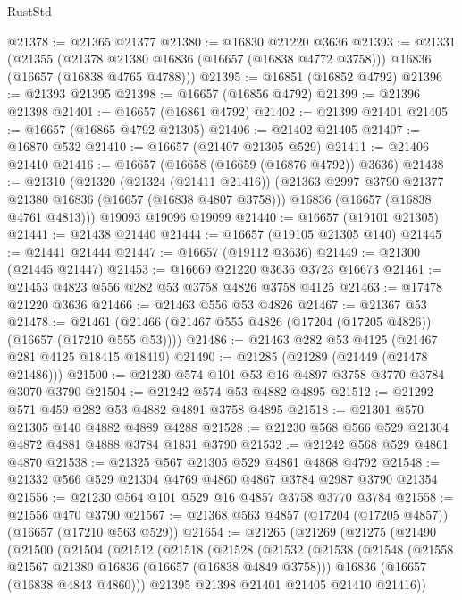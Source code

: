 \begin{lexlean}{RustStd}
\begin{coremodule}
@21378 := @21365 @21377
@21380 := @16830 @21220 @3636
@21393 := @21331
    (@21355
      (@21378 @21380 @16836 (@16657 (@16838 @4772 @3758)))
      @16836
      (@16657 (@16838 @4765 @4788)))
@21395 := @16851 (@16852 @4792)
@21396 := @21393 @21395
@21398 := @16657 (@16856 @4792)
@21399 := @21396 @21398
@21401 := @16657 (@16861 @4792)
@21402 := @21399 @21401
@21405 := @16657 (@16865 @4792 @21305)
@21406 := @21402 @21405
@21407 := @16870 @532
@21410 := @16657 (@21407 @21305 @529)
@21411 := @21406 @21410
@21416 := @16657 (@16658 (@16659 (@16876 @4792)) @3636)
@21438 := @21310
    (@21320
      (@21324 (@21411 @21416))
      (@21363 @2997 @3790 @21377 @21380 @16836 (@16657 (@16838 @4807 @3758)))
      @16836
      (@16657 (@16838 @4761 @4813)))
    @19093
    @19096
    @19099
@21440 := @16657 (@19101 @21305)
@21441 := @21438 @21440
@21444 := @16657 (@19105 @21305 @140)
@21445 := @21441 @21444
@21447 := @16657 (@19112 @3636)
@21449 := @21300 (@21445 @21447)
@21453 := @16669 @21220 @3636 @3723 @16673
@21461 := @21453 @4823 @556 @282 @53 @3758 @4826 @3758 @4125
@21463 := @17478 @21220 @3636
@21466 := @21463 @556 @53 @4826
@21467 := @21367 @53
@21478 := @21461 (@21466 (@21467 @555 @4826 (@17204 (@17205 @4826)) (@16657 (@17210 @555 @53))))
@21486 := @21463 @282 @53 @4125 (@21467 @281 @4125 @18415 @18419)
@21490 := @21285 (@21289 (@21449 (@21478 @21486)))
@21500 := @21230 @574 @101 @53 @16 @4897 @3758 @3770 @3784 @3070 @3790
@21504 := @21242 @574 @53 @4882 @4895
@21512 := @21292 @571 @459 @282 @53 @4882 @4891 @3758 @4895
@21518 := @21301 @570 @21305 @140 @4882 @4889 @4288
@21528 := @21230 @568 @566 @529 @21304 @4872 @4881 @4888 @3784 @1831 @3790
@21532 := @21242 @568 @529 @4861 @4870
@21538 := @21325 @567 @21305 @529 @4861 @4868 @4792
@21548 := @21332 @566 @529 @21304 @4769 @4860 @4867 @3784 @2987 @3790 @21354
@21556 := @21230 @564 @101 @529 @16 @4857 @3758 @3770 @3784
@21558 := @21556 @470 @3790
@21567 := @21368 @563 @4857 (@17204 (@17205 @4857)) (@16657 (@17210 @563 @529))
@21654 := @21265
    (@21269
      (@21275
        (@21490
          (@21500
            (@21504
              (@21512
                (@21518
                  (@21528
                    (@21532
                      (@21538
                        (@21548
                          (@21558 @21567 @21380 @16836 (@16657 (@16838 @4849 @3758)))
                          @16836
                          (@16657 (@16838 @4843 @4860)))
                        @21395
                        @21398
                        @21401
                        @21405
                        @21410
                        @21416))

\end{coremodule}
\end{lexlean}
